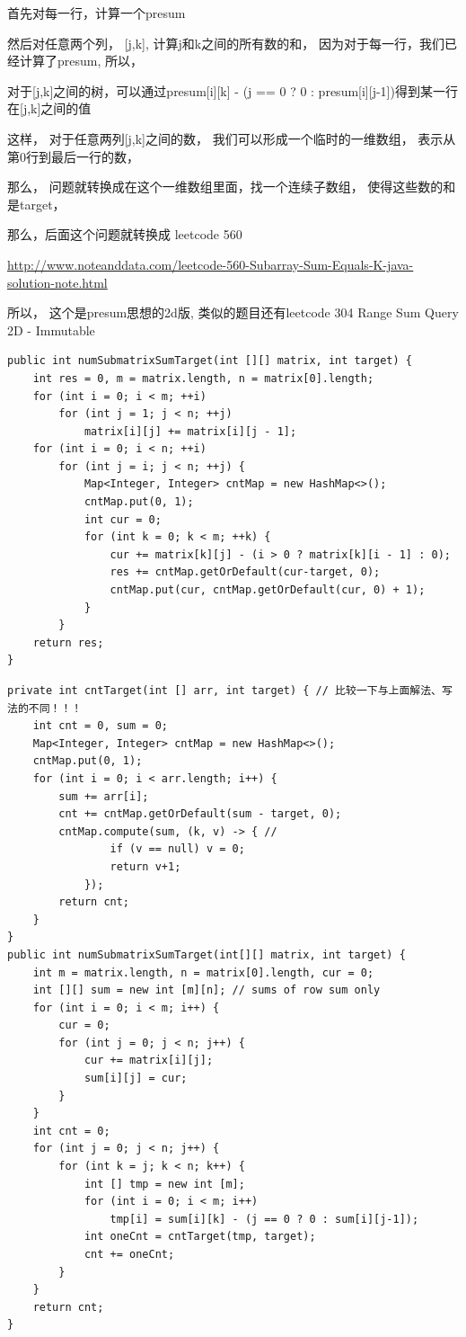 \documentclass[9pt, b5paaper]{book}
\begin{document}
首先对每一行，计算一个presum

然后对任意两个列， [j,k], 计算j和k之间的所有数的和， 因为对于每一行，我们已经计算了presum, 所以，

对于[j,k]之间的树，可以通过presum[i][k] - (j == 0 ? 0 : presum[i][j-1])得到某一行在[j,k]之间的值

这样， 对于任意两列[j,k]之间的数， 我们可以形成一个临时的一维数组， 表示从第0行到最后一行的数，

那么， 问题就转换成在这个一维数组里面，找一个连续子数组， 使得这些数的和是target，

那么，后面这个问题就转换成 leetcode 560

\url{http://www.noteanddata.com/leetcode-560-Subarray-Sum-Equals-K-java-solution-note.html}

所以， 这个是presum思想的2d版, 类似的题目还有leetcode 304 Range Sum Query 2D - Immutable
\begin{verbatim}
public int numSubmatrixSumTarget(int [][] matrix, int target) {
    int res = 0, m = matrix.length, n = matrix[0].length;
    for (int i = 0; i < m; ++i) 
        for (int j = 1; j < n; ++j) 
            matrix[i][j] += matrix[i][j - 1];
    for (int i = 0; i < n; ++i) 
        for (int j = i; j < n; ++j) {
            Map<Integer, Integer> cntMap = new HashMap<>();
            cntMap.put(0, 1);
            int cur = 0;
            for (int k = 0; k < m; ++k) {
                cur += matrix[k][j] - (i > 0 ? matrix[k][i - 1] : 0);
                res += cntMap.getOrDefault(cur-target, 0);
                cntMap.put(cur, cntMap.getOrDefault(cur, 0) + 1);
            }
        }
    return res;
}
\end{verbatim}
\begin{verbatim}
private int cntTarget(int [] arr, int target) { // 比较一下与上面解法、写法的不同！！！
    int cnt = 0, sum = 0;
    Map<Integer, Integer> cntMap = new HashMap<>();
    cntMap.put(0, 1);
    for (int i = 0; i < arr.length; i++) {
        sum += arr[i];
        cnt += cntMap.getOrDefault(sum - target, 0);
        cntMap.compute(sum, (k, v) -> { // 
                if (v == null) v = 0;
                return v+1;
            });
        return cnt;
    }
}
public int numSubmatrixSumTarget(int[][] matrix, int target) {
    int m = matrix.length, n = matrix[0].length, cur = 0;
    int [][] sum = new int [m][n]; // sums of row sum only
    for (int i = 0; i < m; i++) {
        cur = 0;
        for (int j = 0; j < n; j++) {
            cur += matrix[i][j];
            sum[i][j] = cur;
        }
    }
    int cnt = 0;
    for (int j = 0; j < n; j++) {
        for (int k = j; k < n; k++) {
            int [] tmp = new int [m];
            for (int i = 0; i < m; i++) 
                tmp[i] = sum[i][k] - (j == 0 ? 0 : sum[i][j-1]);
            int oneCnt = cntTarget(tmp, target);
            cnt += oneCnt;
        }
    }
    return cnt;
}
\end{verbatim}
\end{document}
